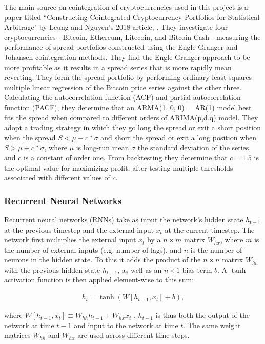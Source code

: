 \documentclass{article}
\begin{document}
The main source on cointegration of cryptocurrencies used in this project is a paper titled ``Constructing Cointegrated Cryptocurrency Portfolios for Statistical Arbitrage" by Leung and Nguyen's 2018 article, \cite{leung2018constructing}. They investigate four cryptocurrencies - Bitcoin, Ethereum, Litecoin, and Bitcoin Cash - measuring the performance of spread portfolios constructed using the Engle-Granger and Johansen cointegration methods. They find the Engle-Granger approach to be more profitable as it results in a spread series that is more rapidly mean reverting. They form the spread portfolio by performing ordinary least squares multiple linear regression of the Bitcoin price series against the other three. Calculating the autocorrelation function (ACF) and partial autocorrelation function (PACF), they determine that an ARMA(1, 0, 0) = AR(1) model best fits the spread when compared to different orders of ARIMA(p,d,q) model. They adopt a trading strategy in which they go long the spread or exit a short position when the spread $S < \mu -  c * \sigma$ and short the spread or exit a long position when $S > \mu +  c * \sigma$, where $\mu$ is long-run mean $\sigma$ the standard deviation of the series, and $c$ is a constant of order one. From backtesting they determine that $c = 1.5$ is the optimal value for maximizing profit, after testing multiple thresholds associated with different values of $c$. 


\subsubsection{Recurrent Neural Networks}

Recurrent neural networks (RNNs) take as input the network's hidden state $h_{t-1}$ at the previous timestep and the external input $x_{t}$ at the current timestep. The network first multiplies the external input  $x_{t}$ by a $n \times m$ matrix $W_{hx}$, where $m$ is the number of external inputs (e.g. number of lags), and $n$ is the number of neurons in the hidden state. To this it adds the product of the $n \times n$ matrix $W_{hh}$ with the previous hidden state $h_{t-1}$, as well as an $n \times 1$ bias term $b$. A $\tanh$ activation function is then applied element-wise to this sum: 

\begin{align}
h_{t} = \tanh(W [h_{t-1}, x_{t}] + b),
\end{align} 

\noindent where $W [h_{t-1}, x_{t}] \equiv W_{hh} h_{t-1} + W_{hx} x_{t}$ . $h_{t-1}$ is thus both the output of the network at time $t-1$ and input to the network at time $t$.  The same weight matrices $W_{hh}$ and  $W_{hx}$ are used across different time steps. 
\end{document}
